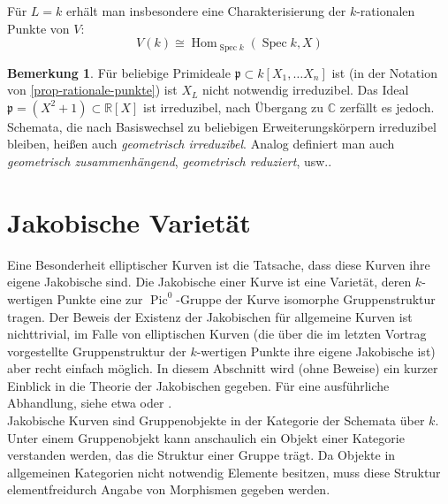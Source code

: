 \documentclass{amsart}
\theoremstyle{plain}
\theoremstyle{definition}
\newtheorem{remark}[subsection]{Bemerkung}
\newcommand{\spec}{\operatorname{Spec}}
\newcommand{\pic}{\operatorname{Pic}}
\renewcommand{\hom}{\operatorname{Hom}}
\newcommand{\idealp}{\mathfrak{p}}
\begin{document}
\noindent Für $L = k$ erhält man insbesondere eine Charakterisierung der $k$-rationalen Punkte von $V$: 
\begin{equation*}
	V(k) \cong \hom_{\spec k}(\spec k, X)
\end{equation*}

\begin{remark}
	Für beliebige Primideale $\idealp \subset k[X_1, \dots X_n]$ ist (in der Notation von \ref{prop-rationale-punkte}) ist $X_L$ nicht notwendig irreduzibel.
	Das Ideal $\idealp = (X^2 + 1) \subset \mathds{R}[X]$ ist irreduzibel, nach Übergang zu $\mathds{C}$ zerfällt es jedoch. \\
	Schemata, die nach Basiswechsel zu beliebigen Erweiterungskörpern irreduzibel bleiben, heißen auch {\it geometrisch irreduzibel}.
	Analog definiert man auch {\it geometrisch zusammenhängend}, {\it geometrisch reduziert}, usw..
\end{remark}

\section{Jakobische Varietät}
\label{section-jakobische-varietaet}

Eine Besonderheit elliptischer Kurven ist die Tatsache, dass diese Kurven ihre eigene Jakobische sind.
Die Jakobische einer Kurve ist eine Varietät, deren $k$-wertigen Punkte eine zur $\pic^0$-Gruppe der Kurve isomorphe Gruppenstruktur tragen.
Der Beweis der Existenz der Jakobischen für allgemeine Kurven ist nichttrivial, im Falle von elliptischen Kurven (die über die im letzten Vortrag vorgestellte Gruppenstruktur der $k$-wertigen Punkte ihre eigene Jakobische ist) aber recht einfach möglich.
In diesem Abschnitt wird (ohne Beweise) ein kurzer Einblick in die Theorie der Jakobischen gegeben.
Für eine ausführliche Abhandlung, siehe etwa \cite{liu} oder \cite{hartshorne}. \\

\noindent Jakobische Kurven sind Gruppenobjekte in der Kategorie der Schemata über $k$.
Unter einem Gruppenobjekt kann anschaulich ein Objekt einer Kategorie verstanden werden, das die Struktur einer Gruppe trägt.
Da Objekte in allgemeinen Kategorien nicht notwendig Elemente besitzen, muss diese Struktur \glqq elementfrei\grqq durch Angabe von Morphismen gegeben werden.
\end{document}
